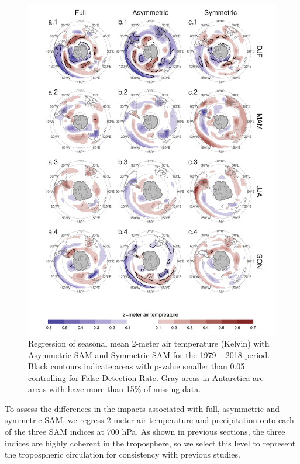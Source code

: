 \documentclass[smallextended]{svjour3}       %
\begin{document}
\begin{figure}
\includegraphics{regr-air-season-1} \caption{Regression of seasonal mean 2-meter air temperature (Kelvin) with Asymmetric SAM and Symmetric SAM for the 1979 -- 2018 period. Black contours indicate areas with p-value smaller than 0.05 controlling for False Detection Rate. Gray areas in Antarctica are areas with have more than 15\% of missing data.}\label{fig:regr-air-season}
\end{figure}

To assess the differences in the impacts associated with full, asymmetric and symmetric SAM, we regress 2-meter air temperature and precipitation onto each of the three SAM indices at 700 hPa. As shown in previous sections, the three indices are highly coherent in the troposphere, so we select this level to represent the tropospheric circulation for consistency with previous studies.
\end{document}
